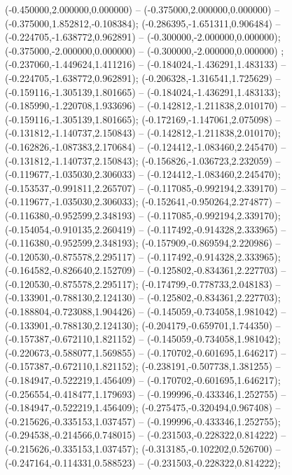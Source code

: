  (-0.450000,2.000000,0.000000) -- (-0.375000,2.000000,0.000000) -- (-0.375000,1.852812,-0.108384);
 (-0.286395,-1.651311,0.906484) -- (-0.224705,-1.638772,0.962891) -- (-0.300000,-2.000000,0.000000);
 (-0.375000,-2.000000,0.000000) -- (-0.300000,-2.000000,0.000000) ;
 (-0.237060,-1.449624,1.411216) -- (-0.184024,-1.436291,1.483133) -- (-0.224705,-1.638772,0.962891);
 (-0.206328,-1.316541,1.725629) -- (-0.159116,-1.305139,1.801665) -- (-0.184024,-1.436291,1.483133);
 (-0.185990,-1.220708,1.933696) -- (-0.142812,-1.211838,2.010170) -- (-0.159116,-1.305139,1.801665);
 (-0.172169,-1.147061,2.075098) -- (-0.131812,-1.140737,2.150843) -- (-0.142812,-1.211838,2.010170);
 (-0.162826,-1.087383,2.170684) -- (-0.124412,-1.083460,2.245470) -- (-0.131812,-1.140737,2.150843);
 (-0.156826,-1.036723,2.232059) -- (-0.119677,-1.035030,2.306033) -- (-0.124412,-1.083460,2.245470);
 (-0.153537,-0.991811,2.265707) -- (-0.117085,-0.992194,2.339170) -- (-0.119677,-1.035030,2.306033);
 (-0.152641,-0.950264,2.274877) -- (-0.116380,-0.952599,2.348193) -- (-0.117085,-0.992194,2.339170);
 (-0.154054,-0.910135,2.260419) -- (-0.117492,-0.914328,2.333965) -- (-0.116380,-0.952599,2.348193);
 (-0.157909,-0.869594,2.220986) -- (-0.120530,-0.875578,2.295117) -- (-0.117492,-0.914328,2.333965);
 (-0.164582,-0.826640,2.152709) -- (-0.125802,-0.834361,2.227703) -- (-0.120530,-0.875578,2.295117);
 (-0.174799,-0.778733,2.048183) -- (-0.133901,-0.788130,2.124130) -- (-0.125802,-0.834361,2.227703);
 (-0.188804,-0.723088,1.904426) -- (-0.145059,-0.734058,1.981042) -- (-0.133901,-0.788130,2.124130);
 (-0.204179,-0.659701,1.744350) -- (-0.157387,-0.672110,1.821152) -- (-0.145059,-0.734058,1.981042);
 (-0.220673,-0.588077,1.569855) -- (-0.170702,-0.601695,1.646217) -- (-0.157387,-0.672110,1.821152);
 (-0.238191,-0.507738,1.381255) -- (-0.184947,-0.522219,1.456409) -- (-0.170702,-0.601695,1.646217);
 (-0.256554,-0.418477,1.179693) -- (-0.199996,-0.433346,1.252755) -- (-0.184947,-0.522219,1.456409);
 (-0.275475,-0.320494,0.967408) -- (-0.215626,-0.335153,1.037457) -- (-0.199996,-0.433346,1.252755);
 (-0.294538,-0.214566,0.748015) -- (-0.231503,-0.228322,0.814222) -- (-0.215626,-0.335153,1.037457);
 (-0.313185,-0.102202,0.526700) -- (-0.247164,-0.114331,0.588523) -- (-0.231503,-0.228322,0.814222);
